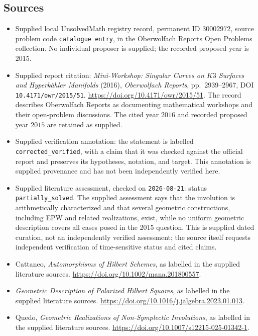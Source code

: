 \documentclass[11pt]{article}
\begin{document}
\subsection{Sources}
\begin{itemize}
\item Supplied local UnsolvedMath registry record, permanent ID \(30002972\), source problem code \texttt{catalogue entry}, in the Oberwolfach Reports Open Problems collection. No individual proposer is supplied; the recorded proposed year is \(2015\).
\item Supplied report citation: \emph{Mini-Workshop: Singular Curves on \(K3\) Surfaces and Hyperkähler Manifolds} (2016), \emph{Oberwolfach Reports}, pp.\ 2939--2967, DOI \texttt{10.4171/owr/2015/51}. \url{https://doi.org/10.4171/owr/2015/51}. The record describes Oberwolfach Reports as documenting mathematical workshops and their open-problem discussions. The cited year \(2016\) and recorded proposed year \(2015\) are retained as supplied.
\item Supplied verification annotation: the statement is labelled \texttt{corrected\_verified}, with a claim that it was checked against the official report and preserves its hypotheses, notation, and target. This annotation is supplied provenance and has not been independently verified here.
\item Supplied literature assessment, checked on \texttt{2026-08-21}: status \texttt{partially\_solved}. The supplied assessment says that the involution is arithmetically characterized and that several geometric constructions, including EPW and related realizations, exist, while no uniform geometric description covers all cases posed in the 2015 question. This is supplied dated curation, not an independently verified assessment; the source itself requests independent verification of time-sensitive status and cited claims.
\item Cattaneo, \emph{Automorphisms of Hilbert Schemes}, as labelled in the supplied literature sources. \url{https://doi.org/10.1002/mana.201800557}.
\item \emph{Geometric Description of Polarized Hilbert Squares}, as labelled in the supplied literature sources. \url{https://doi.org/10.1016/j.jalgebra.2023.01.013}.
\item Quedo, \emph{Geometric Realizations of Non-Symplectic Involutions}, as labelled in the supplied literature sources. \url{https://doi.org/10.1007/s12215-025-01342-1}.
\end{itemize}
\end{document}
